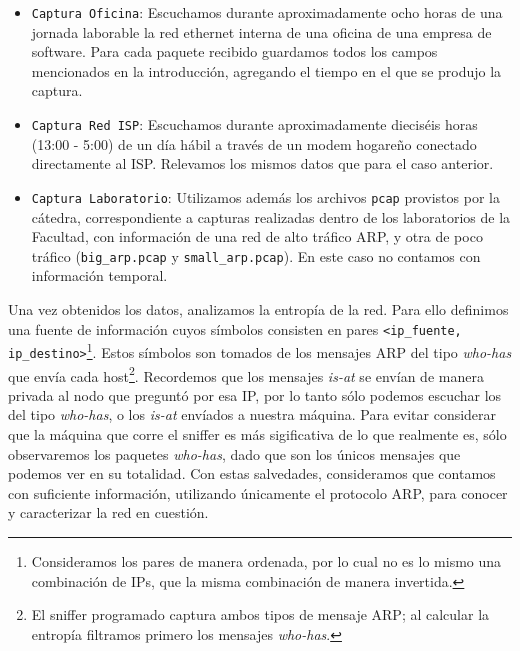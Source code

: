 \begin{itemize}
 \item \texttt{Captura Oficina}: Escuchamos durante aproximadamente ocho horas de una jornada laborable la red ethernet interna de una oficina de una empresa de software. Para cada paquete recibido guardamos todos los campos mencionados en la introducci\'on, agregando el tiempo en el que se produjo la captura.
 
 \item \texttt{Captura Red ISP}: Escuchamos durante aproximadamente dieciséis horas (13:00 - 5:00) de un día hábil a través de un modem hogareño conectado directamente al ISP. Relevamos los mismos datos que para el caso anterior.

 \item \texttt{Captura Laboratorio}: Utilizamos adem\'as los archivos \texttt{pcap} provistos por la c\'atedra, correspondiente a capturas realizadas dentro de los laboratorios de la Facultad, con informaci\'on de una red de alto tr\'afico ARP, y otra de poco tr\'afico (\texttt{big\_arp.pcap} y \texttt{small\_arp.pcap}). En este caso no contamos con información temporal.\\

\end{itemize}

Una vez obtenidos los datos, analizamos la entrop\'ia de la red. Para ello definimos una fuente de informaci\'on cuyos s\'imbolos consisten en pares \texttt{<ip\_fuente, ip\_destino>}\footnote{Consideramos los pares de manera ordenada, por lo cual no es lo mismo una combinaci\'on de IPs, que la misma combinaci\'on de manera invertida.}. Estos s\'imbolos son tomados de los mensajes ARP del tipo \emph{who-has} que env\'ia cada host\footnote{El sniffer programado captura ambos tipos de mensaje ARP; al calcular la entrop\'ia filtramos primero los mensajes \emph{who-has}.}. Recordemos que los mensajes \emph{is-at} se env\'ian de manera privada al nodo que pregunt\'o por esa IP, por lo tanto s\'olo podemos escuchar los del tipo \emph{who-has}, o los \emph{is-at} env\'iados a nuestra m\'aquina. Para evitar considerar que la m\'aquina que corre el sniffer es m\'as sigificativa de lo que realmente es, s\'olo observaremos los paquetes \emph{who-has}, dado que son los únicos mensajes que podemos ver en su totalidad. 
Con estas salvedades, consideramos que contamos con suficiente información, utilizando únicamente el protocolo ARP, para conocer y caracterizar la red en cuestión. \\

